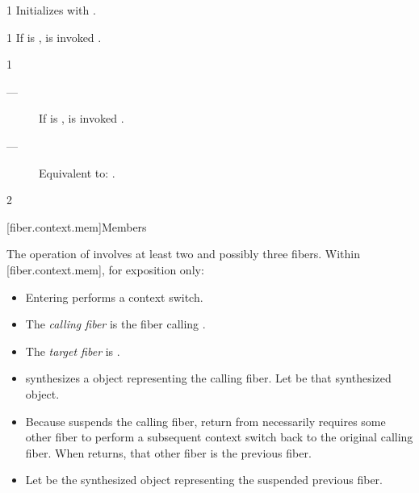 
1 \effects
Initializes  with .


1 \effects
If \emptyfn is \false,  is invoked .


1 \effects
\begin{description}
    \item[---] If \emptyfn is \false,  is invoked .
    \item[---] Equivalent to: .
\end{description}

2 \returns
\this

[fiber.context.mem]{Members}

The operation of \resumewith involves at least two and possibly three fibers.
Within [fiber.context.mem], for exposition only:

\begin{itemize}
    \item Entering \resumewith performs a context switch.
    \item The \emph{calling fiber} is the fiber calling \resumewith.
    \item The \emph{target fiber} is \thefiber{\state}.
    \item \resumewith synthesizes a \fiber object representing the calling
          fiber. Let  be that synthesized \fiber object.
    \item Because \resumewith suspends the calling fiber, return
          from \resumewith necessarily requires some other fiber to perform a
          subsequent context switch back to the original calling fiber.
          When \resumewith returns, that other fiber is the previous fiber.
    \item Let  be the synthesized \fiber object representing the
          suspended previous fiber.
\end{itemize}

